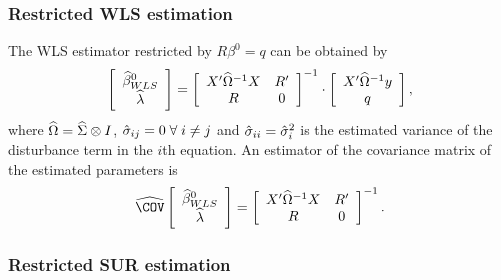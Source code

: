 \subsubsection{Restricted WLS estimation}

The WLS estimator restricted by $R \beta^0 = q$ can be obtained by
\begin{equation}
   \left[ \begin{array}{c}
      \widehat{\beta}^0_{WLS} \\ \widehat{\lambda}
   \end{array} \right]
   =
   \left[ \begin{array}{cc}
      X' \widehat{\Omega}^{-1} X & R' \\
      R & 0
   \end{array} \right]^{-1}
   \cdot
   \left[ \begin{array}{c}
      X' \widehat{\Omega}^{-1} y \\ q
   \end{array} \right] ,
\end{equation}
where $\widehat{\Omega} = \widehat{\Sigma} \otimes I$,
$\hat{\sigma}_{ij} = 0 \; \forall \; i \neq j$ and
$\hat{\sigma}_{ii} = \hat{\sigma}_i^2$ is the estimated variance
of the disturbance term in the $i$th equation.
An estimator of the covariance matrix of the estimated parameters is
\begin{equation}
   \COVHat
   \left[ \begin{array}{c}
      \widehat{\beta}^0_{WLS} \\ \widehat{\lambda}
   \end{array} \right] 
   = 
   \left[ \begin{array}{cc}
      X' \OHat^{-1} X & R' \\
      R & 0
   \end{array} \right]^{-1} .
\end{equation}

\subsubsection{Restricted SUR estimation}


